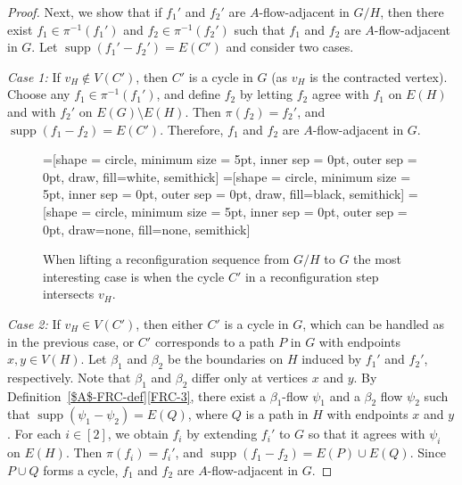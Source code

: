 \documentclass[a4paper,12pt]{article}
\theoremstyle{plain}
\theoremstyle{definition}
\begin{document}
\begin{proof}
Next, we show that if $f_1'$ and $f_2'$ are $A$-flow-adjacent in $G/H$, then there exist $f_1 \in \pi^{-1}(f_1')$ and $f_2 \in \pi^{-1}(f_2')$ such that $f_1$ and $f_2$ are $A$-flow-adjacent in $G$. Let $\operatorname{supp}(f_1' - f_2') = E(C')$ and consider two cases.

\textit{Case 1:} If $v_H \notin V(C')$, then $C'$ is a cycle in $G$ (as $v_H$ is the contracted vertex). Choose any $f_1 \in \pi^{-1}(f_1')$, and define $f_2$ by letting $f_2$ agree with $f_1$ on $E(H)$ and with $f_2'$ on $E(G) \setminus E(H)$. Then $\pi(f_2) = f_2'$, and $\operatorname{supp}(f_1 - f_2) = E(C')$. Therefore, $f_1$ and $f_2$ are $A$-flow-adjacent in $G$.

\begin{figure}[!h]
=[shape = circle, minimum size = 5pt, inner sep = 0pt,
outer sep = 0pt, draw, fill=white, semithick]
=[shape = circle, minimum size = 5pt, inner sep = 0pt,
outer sep = 0pt, draw, fill=black, semithick]
=[shape = circle, minimum size = 5pt, inner sep = 0pt,
outer sep = 0pt, draw=none, fill=none, semithick]
\tikzset{every node/.style=uStyle}
\centering
{}
	\captionsetup{width=.550\textwidth}
	\caption{
When lifting a reconfiguration sequence from $G/H$ to $G$ 
the most interesting case is when the cycle $C'$ in a reconfiguration step 
intersects $v_H$.}
\end{figure}


\textit{Case 2:} If $v_H \in V(C')$, then either $C'$ is a cycle in $G$, which can be handled as in the previous case, or $C'$ corresponds to a path $P$ in $G$ with endpoints $x, y \in V(H)$. Let $\beta_1$ and $\beta_2$ be the boundaries on $H$ induced by $f_1'$ and $f_2'$, respectively. Note that $\beta_1$ and $\beta_2$ differ only at vertices $x$ and $y$. By Definition~\ref{$A$-FRC-def}\ref{FRC-3}, there exist a $\beta_1$-flow $\psi_1$ and a $\beta_2$ flow $\psi_2$ such that $\operatorname{supp}(\psi_1 - \psi_2) = E(Q)$, where $Q$ is a path in $H$ with endpoints $x$ and $y$. For each $i \in [2]$, we obtain $f_i$ by extending $f_i'$ to $G$ so that it agrees with $\psi_i$ on $E(H)$. Then $\pi(f_i) = f_i'$, and $\operatorname{supp}(f_1 - f_2) = E(P) \cup E(Q)$. Since $P \cup Q$ forms a cycle, $f_1$ and $f_2$ are $A$-flow-adjacent in $G$.


\end{proof}
\end{document}
